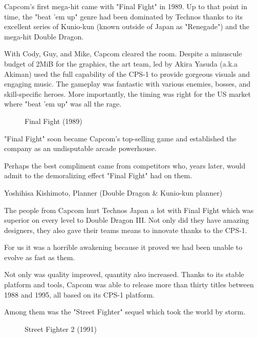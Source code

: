 Capcom's first mega-hit came with "Final Fight" in 1989. Up to that point in time, the "beat 'em up" genre had been dominated by Technos thanks to its excellent series of Kunio-kun (known outside of Japan as "Renegade") and the mega-hit Double Dragon. 

With Cody, Guy, and Mike, Capcom cleared the room. Despite a minuscule budget of 2MiB for the graphics, the art team, led by Akira Yasuda (a.k.a Akiman) used the full capability of the CPS-1 to provide gorgeous visuals and engaging music. The gameplay was fantastic with various enemies, bosses, and skill-specific heroes. More importantly, the timing was right for the US market where "beat 'em up" was all the rage.



  

\label{nin_ff}
 \begin{figure}[H]
\caption*{Final Fight (1989)}
\end{figure}

"Final Fight" soon became Capcom's top-selling game\cite{birth_of_chunli} and established the company as an undisputable arcade powerhouse.

\pagebreak

Perhaps the best compliment came from competitors who, years later, would admit to the demoralizing effect "Final Fight" had on them.

\begin{q}{Yoshihisa Kishimoto, Planner (Double Dragon \& Kunio-kun planner)\cite{dd} }
  

  The people from Capcom hurt Technos Japan a lot with Final Fight which was superior on every level to Double Dragon III. Not only did they have amazing designers, they also gave their teams means to innovate thanks to the CPS-1. 

  For us it was a horrible awakening because it proved we had been unable to evolve as fast as them.
  \end{q}



Not only was quality improved, quantity also increased. Thanks to its stable platform and tools, Capcom was able to release more than thirty titles between 1988 and 1995, all based on its CPS-1 platform. 

Among them was the "Street Fighter" sequel which took the world by storm.

\label{nin_sf2}
\begin{figure}[H]
\caption*{Street Fighter 2 (1991)}
\end{figure}

